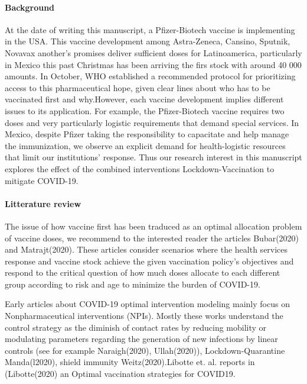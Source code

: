 \paragraph{Background}
         At the date of writing this manuscript, a Pfizer-Biotech vaccine is 
    implementing in the USA. This vaccine development among Astra-Zeneca, 
    Cansino, Sputnik, Novavax another's promises deliver sufficient doses 
    for Latinoamerica, particularly in Mexico this past Christmas has been 
    arriving the firs stock with around 40 000 amounts. In October, WHO 
    established a recommended protocol for prioritizing access to this 
    pharmaceutical hope, given clear lines about who has to be vaccinated first 
    and why.However, each vaccine development implies different issues to its 
    application. For example, the Pfizer-Biotech vaccine requires two doses and 
    very particularly logistic requirements that demand special services. In 
    Mexico, despite Pfizer taking the responsibility to capacitate and help 
    manage the immunization, we observe an explicit demand for health-logistic 
    resources that limit our institutions' response. Thus our research interest 
    in this manuscript explores the effect of the combined interventions 
    Lockdown-Vaccination to mitigate COVID-19.


\paragraph{Litterature review}
        The issue of how vaccine first has been traduced as an optimal 
    allocation problem of vaccine doses, we recommend to the interested reader 
    the articles Bubar(2020) and  Matrajt(2020).  These articles consider 
    scenarios where the health services response and vaccine stock achieve the 
    given vaccination policy's objectives and respond to the critical question 
    of how much doses allocate to each different group according to risk and 
    age to minimize the burden of COVID-19.
    
        Early articles about COVID-19 optimal intervention modeling mainly 
    focus on Nonpharmaceutical interventions (NPIs). Mostly these works 
    understand the control strategy as the diminish of contact rates by 
    reducing mobility or modulating parameters regarding the generation of new 
    infections by linear controls (see for example Naraigh(2020),  
    Ullah(2020)), Lockdown-Quarantine Manda(l2020),  shield immunity 
    Weitz(2020).Libotte et. al. reports in (Libotte(2020) an Optimal vaccination 
    strategies for COVID19.
